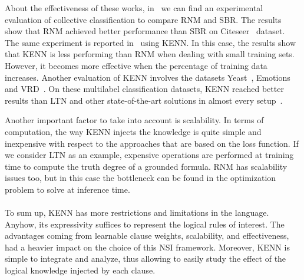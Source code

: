 About the effectiveness of these works, in~\cite{rnm} we can find an experimental evaluation of collective classification to compare RNM and SBR. The results show that RNM achieved better performance than SBR on Citeseer~\cite{citeseer} dataset. The same experiment is reported in~\cite{daniele2021neural} using KENN. In this case, the results show that KENN is less performing than RNM when dealing with small training sets. However, it becomes more effective when the percentage of training data increases. Another evaluation of KENN involves the datasets Yeast~\cite{yeast}, Emotions~\cite{emotions} and VRD~\cite{vrd}. On these multilabel classification datasets, KENN reached better results than LTN and other state-of-the-art solutions in almost every setup~\cite{kenn}.

Another important factor to take into account is scalability. In terms of computation, the way KENN injects the knowledge is quite simple and inexpensive with respect to the approaches that are based on the loss function. If we consider LTN as an example, expensive operations are performed at training time to compute the truth degree of a grounded formula. RNM has scalability issues too, but in this case the bottleneck can be found in the optimization problem to solve at inference time.
\\\\
To sum up, KENN has more restrictions and limitations in the language. Anyhow, its expressivity suffices to represent the logical rules of interest. The advantages coming from learnable clause weights, scalability, and effectiveness, had a heavier impact on the choice of this NSI framework. Moreover, KENN is simple to integrate and analyze, thus allowing to easily study the effect of the logical knowledge injected by each clause.